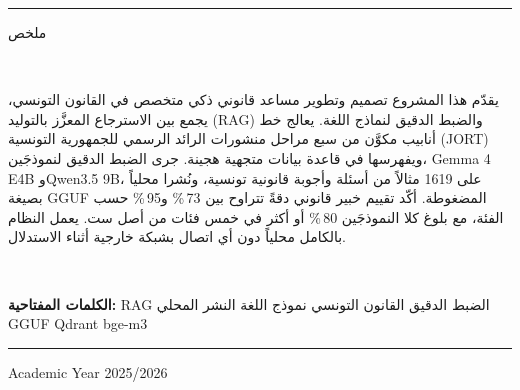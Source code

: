 \begin{center}
\vspace{0.12cm}
\rule{0.6\linewidth}{0.4pt}
\vspace{0.12cm}

{\bfseries \begin{Arabic}ملخص\end{Arabic}}\\[0.25cm]
\begin{minipage}{0.85\textwidth}
\centering
\begin{Arabic}
يقدّم هذا المشروع تصميم وتطوير مساعد قانوني ذكي متخصص في القانون التونسي،
يجمع بين الاسترجاع المعزَّز بالتوليد (RAG) والضبط الدقيق لنماذج اللغة.
يعالج خط أنابيب مكوَّن من سبع مراحل منشورات الرائد الرسمي للجمهورية التونسية (JORT)
ويفهرسها في قاعدة بيانات متجهية هجينة.
جرى الضبط الدقيق لنموذجَين، Gemma 4 E4B وQwen3.5 9B، على 1619 مثالاً من أسئلة
وأجوبة قانونية تونسية، ونُشرا محلياً بصيغة GGUF المضغوطة.
أكّد تقييم خبير قانوني دقةً تتراوح بين 73\,\% و95\,\% حسب الفئة،
مع بلوغ كلا النموذجَين 80\,\% أو أكثر في خمس فئات من أصل ست.
يعمل النظام بالكامل محلياً دون أي اتصال بشبكة خارجية أثناء الاستدلال.
\end{Arabic}
\end{minipage}\\[0.15cm]
\begin{Arabic}
{\bfseries الكلمات المفتاحية:} RAG \textbullet{} الضبط الدقيق \textbullet{} القانون التونسي
\textbullet{} نموذج اللغة \textbullet{} النشر المحلي \textbullet{} GGUF \textbullet{} Qdrant \textbullet{} bge-m3
\end{Arabic}
\end{center}
\vfill
\noindent\rule{\linewidth}{0.6pt}
\begin{center}
{\small Academic Year 2025/2026}
\end{center}

\clearpage
